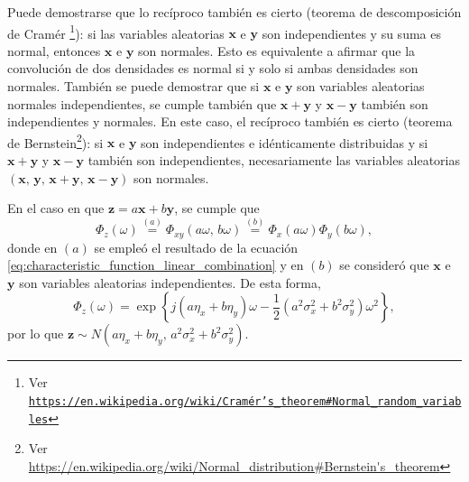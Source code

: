 \documentclass[a4paper]{report}
\newcommand{\x}{\mathbf{x}}
\newcommand{\y}{\mathbf{y}}
\newcommand{\z}{\mathbf{z}}
\begin{document}
Puede demostrarse que lo recíproco también es cierto (teorema de descomposición de Cramér
\footnote{Ver \href{https://en.wikipedia.org/wiki/Cram\%C3\%A9r\%27s_theorem\#Normal_random_variables}{\texttt{https://en.wikipedia.org/wiki/Cramér's\_theorem\#Normal\_random\_variables}}}): si las variables aleatorias \(\x\) e \(\y\) son independientes y su suma es normal, entonces \(\x\) e \(\y\) son normales. Esto es equivalente a afirmar que la convolución de dos densidades es normal si y solo si ambas densidades son normales. También se puede demostrar que si \(\x\) e \(\y\) son variables aleatorias normales independientes, se cumple también que \(\x+\y\) y \(\x-\y\) también son independientes y normales. En este caso, el recíproco también es cierto (teorema de Bernstein\footnote{Ver \url{https://en.wikipedia.org/wiki/Normal_distribution\#Bernstein's_theorem}}): si \(\x\) e \(\y\) son independientes e idénticamente distribuidas y si \(\x+\y\) y \(\x-\y\) también son independientes, necesariamente las variables aleatorias \((\x,\,\y,\,\x+\y,\,\x-\y)\) son normales.

En el caso en que \(\z=a\x+b\y\), se cumple que
\[
 \Phi_z(\omega)\overset{(a)}{=}\Phi_{xy}(a\omega,\,b\omega)\overset{(b)}{=}\Phi_x(a\omega)\Phi_y(b\omega),
\]
donde en \((a)\) se empleó el resultado de la ecuación \ref{eq:characteristic_function_linear_combination} y en \((b)\) se consideró que \(\x\) e \(\y\) son variables aleatorias independientes. De esta forma,
\[
 \Phi_z(\omega)=\exp\left\{j(a\eta_x+b\eta_y)\omega-\frac{1}{2}(a^2\sigma_x^2+b^2\sigma_y^2)\omega^2\right\},
\]
por lo que \(\z\sim N(a\eta_x+b\eta_y,\,a^2\sigma_x^2+b^2\sigma_y^2)\).
\end{document}
